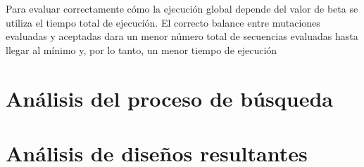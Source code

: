Para evaluar correctamente cómo la ejecución global depende del valor de beta se utiliza el tiempo total de ejecución. 
El correcto balance entre mutaciones evaluadas y aceptadas dara un menor número total de secuencias evaluadas hasta llegar al mínimo y, por lo tanto, un menor tiempo de ejecución 


\section{Análisis del proceso de búsqueda}





\section{Análisis de diseños resultantes}

